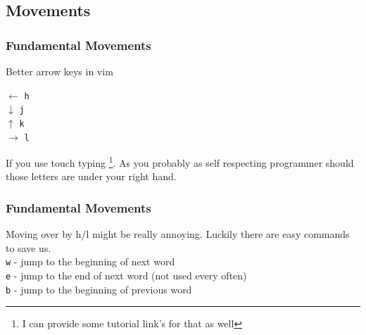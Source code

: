 \documentclass{beamer}
\begin{document}
    \subsection{Movements}
    \begin{frame}
    \frametitle{Fundamental Movements}
        Better arrow keys in vim\\
        \begin{center}
            $\leftarrow$ \texttt{h}\\
            $\downarrow$ \texttt{j}\\
            $\uparrow$ \texttt{k}\\
            $\rightarrow$ \texttt{l}
        \end{center}
        If you use touch typing 
        \footnote{I can provide some tutorial link's for that as well}.
        As you probably as self respecting programmer should
        those letters are under your right hand.
    \end{frame}
    \begin{frame}
    \frametitle{Fundamental Movements}
        Moving over by h/l might be really annoying. Luckily there are easy commands to
        save us.\\
        \texttt{w} - jump to the beginning of next word\\
        \texttt{e} - jump to the end of next word (not used every often)\\
        \texttt{b} - jump to the beginning of previous word\\
    \end{frame}
\end{document}
